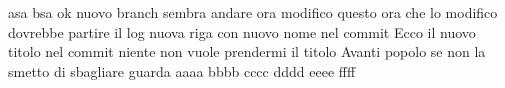 \documentclass{article}
\begin{document}
asa
bsa
ok nuovo branch
sembra andare
ora modifico questo
ora che lo modifico dovrebbe partire il log
nuova riga con nuovo nome nel commit
Ecco il nuovo titolo nel commit
niente non vuole prendermi il titolo
Avanti popolo
se non la smetto di sbagliare guarda
aaaa
bbbb
cccc
dddd
eeee
ffff
\end{document}
